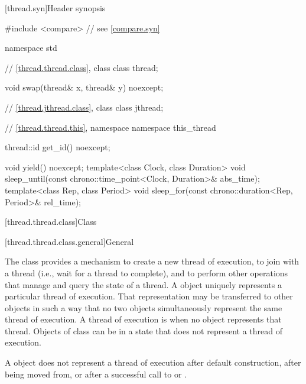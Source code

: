 [thread.syn]{Header  synopsis}

%
\begin{codeblock}
#include <compare>              // see \ref{compare.syn}

namespace std {
  // \ref{thread.thread.class}, class 
  class thread;

  void swap(thread& x, thread& y) noexcept;

  // \ref{thread.jthread.class}, class 
  class jthread;

  // \ref{thread.thread.this}, namespace 
  namespace this_thread {
    thread::id get_id() noexcept;

    void yield() noexcept;
    template<class Clock, class Duration>
      void sleep_until(const chrono::time_point<Clock, Duration>& abs_time);
    template<class Rep, class Period>
      void sleep_for(const chrono::duration<Rep, Period>& rel_time);
  }
}
\end{codeblock}

[thread.thread.class]{Class }

[thread.thread.class.general]{General}

\pnum
The class  provides a mechanism to create a new thread of execution, to join with
a thread (i.e., wait for a thread to complete), and to perform other operations that manage and
query the state of a thread. A  object uniquely represents a particular thread of
execution. That representation may be transferred to other  objects in such a way
that no two  objects simultaneously represent the same thread of execution. A
thread of execution is  when no  object represents that thread.
Objects of class  can be in a state that does not represent a thread of
execution.
\begin{note}
A  object does not represent a thread of execution after
default construction, after being moved from, or after a successful call to  or
.
\end{note}

